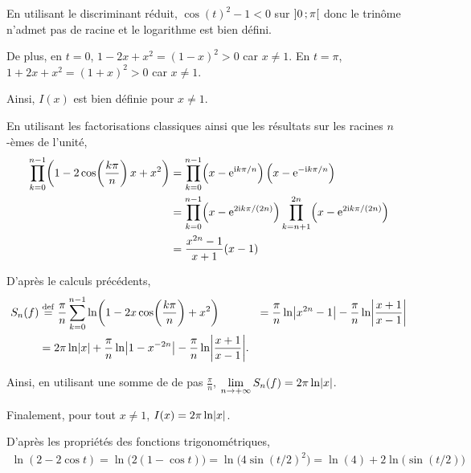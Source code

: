 \begin{solution}
\begin{reponses}
\item En utilisant le discriminant réduit, $\cos(t)^2 - 1 < 0$ sur $\left]0\,;\pi\right[$ donc le trinôme n'admet pas de racine et le logarithme est bien défini.

De plus, en $t = 0$, $1 - 2 x + x^2 = (1 - x)^2 > 0$ car $x \neq 1$.
En $t = \pi$, $1 + 2 x + x^2 = (1 + x)^2 > 0$ car $x \neq 1$.

Ainsi, $I(x)$ est bien définie pour $x \neq 1$.

\item En utilisant les factorisations classiques ainsi que les résultats sur les racines $n$-èmes de l'unité,
\begin{align*}
\prod_{k=0}^{n-1} \mathopen{}\left(1 - 2 \cos\mathopen{}\left(\frac{k\pi}{n}\right) x + x^2\right)
&= \prod_{k=0}^{n-1} \mathopen{}\left(x - \mathrm{e}^{\mathrm{i} k\pi/n}\right) \mathopen{}\left(x - \mathrm{e}^{-\mathrm{i} k\pi/n}\right) \\
&= \prod_{k=0}^{n-1} \mathopen{}\left(x - \mathrm{e}^{2\mathrm{i} k\pi/(2n)}\right) \prod_{k=n+1}^{2n} \mathopen{}\left(x - \mathrm{e}^{2\mathrm{i} k\pi/(2n)}\right) \\
&= \frac{x^{2n} - 1}{x + 1} (x - 1)
\end{align*}

\item D'après le calculs précédents,
\begin{align*}
S_n(f)
&\overset{\mathrm{\tiny def}}{=} \frac{\pi}{n}\sum\limits_{k=0}^{n-1} \ln\mathopen{}\left(1 - 2 x \cos\mathopen{}\left(\frac{k\pi}{n}\right) + x^2\right)
&= \frac{\pi}{n} \ln\mathopen{}\abs{x^{2n}-1} - \frac{\pi}{n} \ln \mathopen{}\abs{\frac{x+1}{x-1}} \\
&= 2 \pi \ln\mathopen{}\abs{x} + \frac{\pi}{n} \ln \mathopen{}\abs{1 - x^{-2n}} - \frac{\pi}{n} \ln \mathopen{}\abs{\frac{x+1}{x-1}}.
\end{align*}

Ainsi, en utilisant une somme de  de pas $\frac{\pi}{n}$, $\lim\limits_{n\to +\infty} S_n(f) = 2 \pi \ln\mathopen{}\abs{x}$.

Finalement, pour tout $x \neq 1$, $I(x) = 2 \pi \ln\mathopen{}\abs{x}$.
\item {}D'après les propriétés des fonctions trigonométriques,
\begin{align*}
\ln(2 - 2 \cos t)
= \ln\mathopen{}\big(2(1 - \cos t)\big)
= \ln\mathopen{}\big(4 \sin(t/2)^2\big)
= \ln(4) + 2 \ln\mathopen{}\big(\sin(t/2)\big)
\end{align*}


\end{reponses}
\end{solution}
